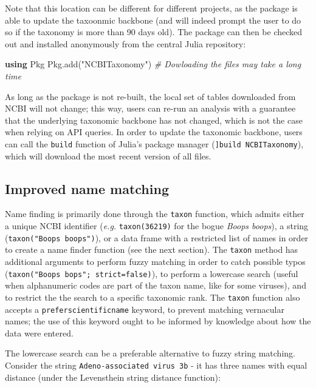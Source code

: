 \documentclass[10pt,oneside]{article}
\newenvironment{Shaded}{\begin{snugshade}}{\end{snugshade}}
\newcommand{\KeywordTok}[1]{\textcolor[rgb]{0.13,0.29,0.53}{\textbf{#1}}}
\newcommand{\StringTok}[1]{\textcolor[rgb]{0.31,0.60,0.02}{#1}}
\newcommand{\CommentTok}[1]{\textcolor[rgb]{0.56,0.35,0.01}{\textit{#1}}}
\newcommand{\NormalTok}[1]{#1}
\begin{document}
Note that this location can be different for different projects, as the
package is able to update the taxoonmic backbone (and will indeed prompt
the user to do so if the taxonomy is more than 90 days old). The package
can then be checked out and installed anonymously from the central Julia
repository:

\begin{Shaded}
\begin{Highlighting}[]
\KeywordTok{using}\NormalTok{ Pkg}
\NormalTok{Pkg.add(}\StringTok{"NCBITaxonomy"}\NormalTok{) }\CommentTok{\# Dowloading the files may take a long time}
\end{Highlighting}
\end{Shaded}

As long as the package is not re-built, the local set of tables
downloaded from NCBI will not change; this way, users can re-run an
analysis with a guarantee that the underlying taxonomic backbone has not
changed, which is not the case when relying on API queries. In order to
update the taxonomic backbone, users can call the \texttt{build}
function of Julia's package manager (\texttt{{]}build\ NCBITaxonomy}),
which will download the most recent version of all files.

\hypertarget{improved-name-matching}{%
\subsection{Improved name matching}\label{improved-name-matching}}

Name finding is primarily done through the \texttt{taxon} function,
which admits either a unique NCBI identifier (\emph{e.g.}
\texttt{taxon(36219)} for the bogue \emph{Boops boops}), a string
(\texttt{taxon("Boops\ boops")}), or a data frame with a restricted list
of names in order to create a name finder function (see the next
section). The \texttt{taxon} method has additional arguments to perform
fuzzy matching in order to catch possible typos
(\texttt{taxon("Boops\ bops";\ strict=false)}), to perform a lowercase
search (useful when alphanumeric codes are part of the taxon name, like
for some viruses), and to restrict the the search to a specific
taxonomic rank. The \texttt{taxon} function also accepts a
\texttt{preferscientificname} keyword, to prevent matching vernacular
names; the use of this keyword ought to be informed by knowledge about
how the data were entered.

The lowercase search can be a preferable alternative to fuzzy string
matching. Consider the string \texttt{Adeno-associated\ virus\ 3b} - it
has three names with equal distance (under the Levensthein string
distance function):
\end{document}
